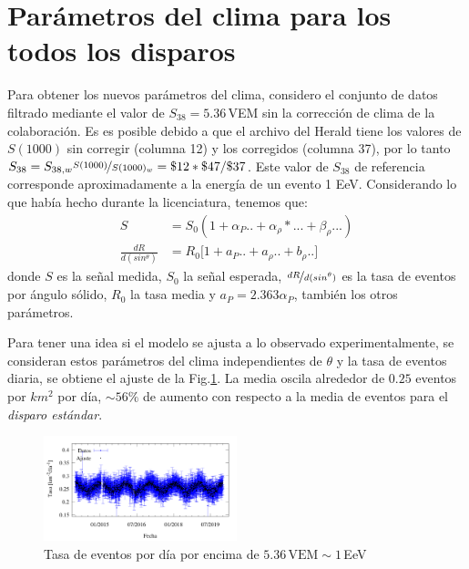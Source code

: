 \section{Parámetros del clima para los todos los disparos}

Para obtener los nuevos parámetros del clima, considero el conjunto de datos filtrado mediante el valor de $S_{38}=5.36\,$VEM sin la corrección de clima de la colaboración. Es es posible debido a que el archivo del Herald tiene los valores de $S(1000)$ sin corregir (columna 12) y los corregidos (columna 37), por lo tanto $S_{38}= S_{38,w}\nicefrac{S(1000)}{S(1000)_w} = \$12*\$47/\$37$. Este valor de $S_{38}$ de referencia corresponde aproximadamente a la energía de un evento 1 EeV. Considerando lo que había hecho durante la licenciatura, tenemos que:
\begin{align}
    S &= S_0 (1 + \alpha_P..+ \alpha_\rho*... + \beta_\rho...)\\
    \frac{dR}{d(sin^\theta)} &=  R_0 \big[ 1 + a_P.. + a_\rho ..+ b_\rho..  \big]
\end{align}
donde $S$ es la señal medida, $S_0$ la señal esperada, $\nicefrac{dR}{d(sin^\theta)}$ es la tasa de eventos por ángulo sólido, $R_0$ la tasa media y  $a_P = 2.363 \alpha_P$, también  los otros parámetros.


Para tener una idea si el modelo se ajusta a  lo observado experimentalmente, se consideran estos parámetros del clima independientes de $\theta$ y la tasa de eventos diaria, se obtiene el ajuste de la Fig.\ref{fig:tasa}. La media oscila alrededor  de $0.25$ eventos por $km^2$ por día, $\sim 56\%$ de aumento con respecto a la media de eventos para el \emph{disparo estándar}. 
\begin{figure}[H]
	\centering
	\includegraphics[width=0.5\textwidth]{figura_rate_durante_6_anhos.png}
	\caption{Tasa de eventos  por día por encima de $5.36\, \text{VEM} \sim 1 $\,EeV}
	\label{fig:tasa}
\end{figure}


